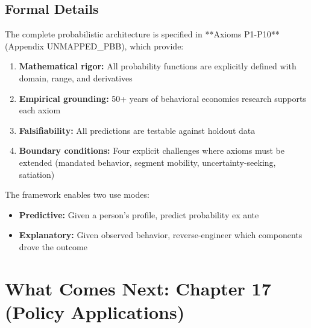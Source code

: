 \subsection{Formal Details}

The complete probabilistic architecture is specified in **Axioms P1-P10** (Appendix UNMAPPED_PBB), which provide:
\begin{enumerate}[nosep]
    \item \textbf{Mathematical rigor:} All probability functions are explicitly defined with domain, range, and derivatives
    \item \textbf{Empirical grounding:} 50+ years of behavioral economics research supports each axiom
    \item \textbf{Falsifiability:} All predictions are testable against holdout data
    \item \textbf{Boundary conditions:} Four explicit challenges where axioms must be extended (mandated behavior, segment mobility, uncertainty-seeking, satiation)
\end{enumerate}

The framework enables two use modes:
\begin{itemize}[nosep]
    \item \textbf{Predictive:} Given a person's profile, predict probability ex ante
    \item \textbf{Explanatory:} Given observed behavior, reverse-engineer which components drove the outcome
\end{itemize}

\section{What Comes Next: Chapter 17 (Policy Applications)}

